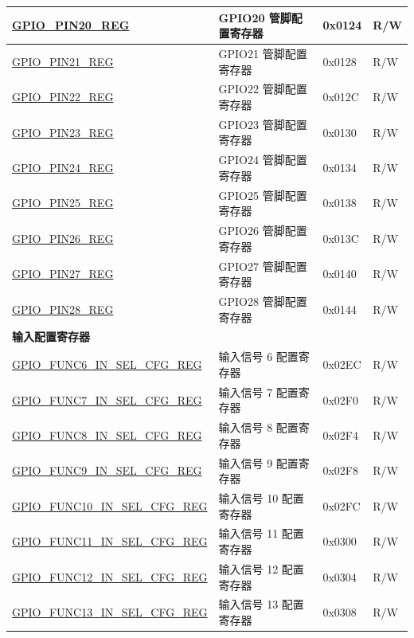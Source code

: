 \begin{longtable}{ | p{6cm} | p{7.2cm} | p{1.3cm} | p{1cm} | }
\hyperref[regdesc:GPIOPINNREG]{GPIO\_PIN20\_REG} & GPIO20 管脚配置寄存器 & 0x0124 & R/W \\ \hline
\hyperref[regdesc:GPIOPINNREG]{GPIO\_PIN21\_REG} & GPIO21 管脚配置寄存器 & 0x0128 & R/W \\ \hline
\hyperref[regdesc:GPIOPINNREG]{GPIO\_PIN22\_REG} & GPIO22 管脚配置寄存器 & 0x012C & R/W \\ \hline
\hyperref[regdesc:GPIOPINNREG]{GPIO\_PIN23\_REG} & GPIO23 管脚配置寄存器 & 0x0130 & R/W \\ \hline
\hyperref[regdesc:GPIOPINNREG]{GPIO\_PIN24\_REG} & GPIO24 管脚配置寄存器 & 0x0134 & R/W \\ \hline
\hyperref[regdesc:GPIOPINNREG]{GPIO\_PIN25\_REG} & GPIO25 管脚配置寄存器 & 0x0138 & R/W \\ \hline
\hyperref[regdesc:GPIOPINNREG]{GPIO\_PIN26\_REG} & GPIO26 管脚配置寄存器 & 0x013C & R/W \\ \hline
\hyperref[regdesc:GPIOPINNREG]{GPIO\_PIN27\_REG} & GPIO27 管脚配置寄存器 & 0x0140 & R/W \\ \hline
\hyperref[regdesc:GPIOPINNREG]{GPIO\_PIN28\_REG} & GPIO28 管脚配置寄存器 & 0x0144 & R/W \\ \hline
\multicolumn{4}{|l|}{\textbf{输入配置寄存器}} \\ \hline
\hyperref[regdesc:GPIOFUNCMINSELCFGREG]{GPIO\_FUNC6\_IN\_SEL\_CFG\_REG} & 输入信号 6 配置寄存器 & 0x02EC & R/W \\ \hline
\hyperref[regdesc:GPIOFUNCMINSELCFGREG]{GPIO\_FUNC7\_IN\_SEL\_CFG\_REG} & 输入信号 7 配置寄存器 & 0x02F0 & R/W \\ \hline
\hyperref[regdesc:GPIOFUNCMINSELCFGREG]{GPIO\_FUNC8\_IN\_SEL\_CFG\_REG} & 输入信号 8 配置寄存器 & 0x02F4 & R/W \\ \hline
\hyperref[regdesc:GPIOFUNCMINSELCFGREG]{GPIO\_FUNC9\_IN\_SEL\_CFG\_REG} & 输入信号 9 配置寄存器 & 0x02F8 & R/W \\ \hline
\hyperref[regdesc:GPIOFUNCMINSELCFGREG]{GPIO\_FUNC10\_IN\_SEL\_CFG\_REG} & 输入信号 10 配置寄存器 & 0x02FC & R/W \\ \hline
\hyperref[regdesc:GPIOFUNCMINSELCFGREG]{GPIO\_FUNC11\_IN\_SEL\_CFG\_REG} & 输入信号 11 配置寄存器 & 0x0300 & R/W \\ \hline
\hyperref[regdesc:GPIOFUNCMINSELCFGREG]{GPIO\_FUNC12\_IN\_SEL\_CFG\_REG} & 输入信号 12 配置寄存器 & 0x0304 & R/W \\ \hline
\hyperref[regdesc:GPIOFUNCMINSELCFGREG]{GPIO\_FUNC13\_IN\_SEL\_CFG\_REG} & 输入信号 13 配置寄存器 & 0x0308 & R/W \\ \hline

\end{longtable}
